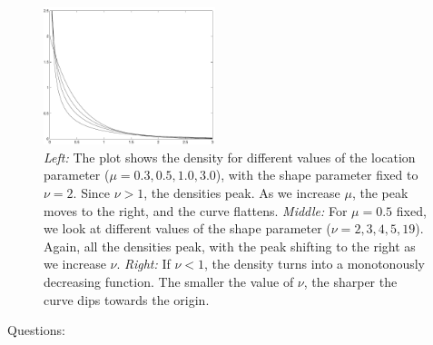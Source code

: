 \documentclass[]{../util/ColumbiaAssm}
\begin{document}
\begin{questions}
\begin{figure}[t]
\begin{center}
  \includegraphics[width=5cm]{analytic_mle__3.pdf}
\end{center}
\caption{
    {\em Left:} The plot shows the density for different values of the
    location parameter ($\mu = 0.3,0.5,1.0,3.0$), with the shape
    parameter fixed to $\nu = 2$.  
    Since $\nu > 1$, the densities peak. As we increase $\mu$, the
    peak moves to the right, and the curve flattens.
    {\em Middle:} For $\mu = 0.5$ fixed, we look at different values of
    the shape parameter ($\nu = 2, 3, 4, 5, 19$). Again, all the
    densities peak, with the peak shifting to the right as we increase $\nu$.
    {\em Right:} If $\nu < 1$, the density turns into a
    monotonously decreasing function. The smaller the value of $\nu$, the
    sharper the curve dips towards the origin. 
}
\label{fig:gamma}
\end{figure}

\newpage
Questions:
    \begin{itemize}
    

\end{itemize}
\end{questions}
\end{document}
